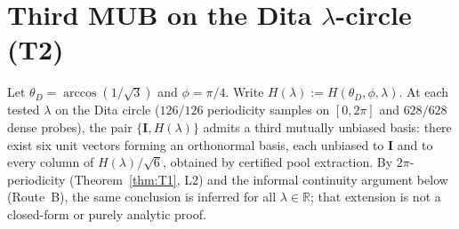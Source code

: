 
\section{Third MUB on the Dita \texorpdfstring{$\lambda$}{lambda}-circle (T2)}
\label{sec:proof-t2}

\begin{theorem}
\label{thm:T2}
Let $\theta_D=\arccos(1/\sqrt3)$ and $\phi=\pi/4$.
Write $H(\lambda):=H(\theta_D,\phi,\lambda)$.
At each tested $\lambda$ on the Dita circle ($126/126$ periodicity samples on $[0,2\pi]$ and $628/628$ dense probes), the pair $\{\mathbf{I},H(\lambda)\}$ admits a third mutually unbiased basis:
there exist six unit vectors forming an orthonormal basis, each unbiased to
$\mathbf{I}$ and to every column of $H(\lambda)/\sqrt6$, obtained by certified pool extraction.
By $2\pi$-periodicity (Theorem~\ref{thm:T1}, L2) and the informal continuity argument below (Route~B), the same conclusion is inferred for all $\lambda\in\mathbb{R}$; that extension is not a closed-form or purely analytic proof.
\end{theorem}

